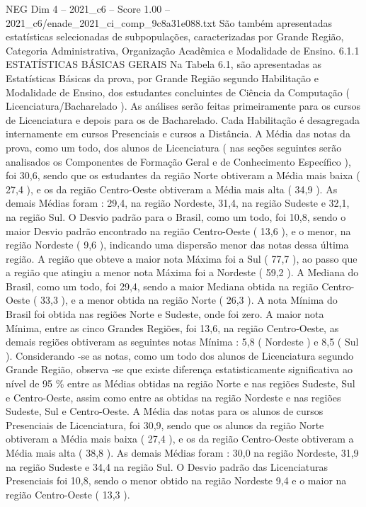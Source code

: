 \begin{textsample}{NEG Dim 4 – 2021\_c6 – Score 1.00 – 2021\_c6/enade\_2021\_ci\_comp\_9c8a31e088.txt}
São também apresentadas estatísticas selecionadas de subpopulações, caracterizadas por Grande Região, Categoria Administrativa, Organização Acadêmica e Modalidade de Ensino. 6.1.1 ESTATÍSTICAS BÁSICAS GERAIS Na Tabela 6.1, são apresentadas as Estatísticas Básicas da prova, por Grande Região segundo Habilitação e Modalidade de Ensino, dos estudantes concluintes de Ciência da Computação ( Licenciatura/Bacharelado ).
As análises serão feitas primeiramente para os cursos de Licenciatura e depois para os de Bacharelado.
Cada Habilitação é desagregada internamente em cursos Presenciais e cursos a Distância.
A Média das notas da prova, como um todo, dos alunos de Licenciatura ( nas seções seguintes serão analisados os Componentes de Formação Geral e de Conhecimento Específico ), foi 30,6, sendo que os estudantes da região Norte obtiveram a Média mais baixa ( 27,4 ), e os da região Centro-Oeste obtiveram a Média mais alta ( 34,9 ).
As demais Médias foram : 29,4, na região Nordeste, 31,4, na região Sudeste e 32,1, na região Sul.
O Desvio padrão para o Brasil, como um todo, foi 10,8, sendo o maior Desvio padrão encontrado na região Centro-Oeste ( 13,6 ), e o menor, na região Nordeste ( 9,6 ), indicando uma dispersão menor das notas dessa última região.
A região que obteve a maior nota Máxima foi a Sul ( 77,7 ), ao passo que a região que atingiu a menor nota Máxima foi a Nordeste ( 59,2 ).
A Mediana do Brasil, como um todo, foi 29,4, sendo a maior Mediana obtida na região Centro-Oeste ( 33,3 ), e a menor obtida na região Norte ( 26,3 ).
A nota Mínima do Brasil foi obtida nas regiões Norte e Sudeste, onde foi zero.
A maior nota Mínima, entre as cinco Grandes Regiões, foi 13,6, na região Centro-Oeste, as demais regiões obtiveram as seguintes notas Mínima : 5,8 ( Nordeste ) e 8,5 ( Sul ).
Considerando -se as notas, como um todo dos alunos de Licenciatura segundo Grande Região, observa -se que existe diferença estatisticamente significativa ao nível de 95 \% entre as Médias obtidas na região Norte e nas regiões Sudeste, Sul e Centro-Oeste, assim como entre as obtidas na região Nordeste e nas regiões Sudeste, Sul e Centro-Oeste.
A Média das notas para os alunos de cursos Presenciais de Licenciatura, foi 30,9, sendo que os alunos da região Norte obtiveram a Média mais baixa ( 27,4 ), e os da região Centro-Oeste obtiveram a Média mais alta ( 38,8 ).
As demais Médias foram : 30,0 na região Nordeste, 31,9 na região Sudeste e 34,4 na região Sul.
O Desvio padrão das Licenciaturas Presenciais foi 10,8, sendo o menor obtido na região Nordeste 9,4 e o maior na região Centro-Oeste ( 13,3 ).

\end{textsample}
